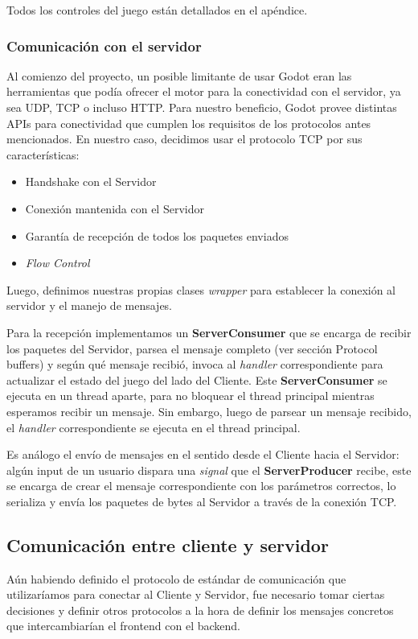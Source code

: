 Todos los controles del juego están detallados en el apéndice.


\subsubsection{Comunicación con el servidor}

\noindent Al comienzo del proyecto, un posible limitante de usar Godot eran las herramientas que podía ofrecer 
el motor para la conectividad con el servidor, ya sea UDP, TCP o incluso HTTP. 
Para nuestro beneficio, Godot provee distintas APIs para conectividad que cumplen los requisitos
de los protocolos antes mencionados. En nuestro caso, decidimos usar el protocolo TCP por sus características:
\begin{itemize}
    \item Handshake con el Servidor
    \item Conexión mantenida con el Servidor
    \item Garantía de recepción de todos los paquetes enviados
    \item \textit{Flow Control}
\end{itemize}

Luego, definimos nuestras propias clases \textit{wrapper} para establecer la conexión al servidor y el 
manejo de mensajes. 

Para la recepción implementamos un \textbf{ServerConsumer} que se encarga de recibir los paquetes 
del Servidor, parsea el mensaje completo (ver sección Protocol buffers) y según qué mensaje recibió, 
invoca al \textit{handler} correspondiente para actualizar el estado del juego del lado del Cliente.
Este \textbf{ServerConsumer} se ejecuta en un thread aparte, para no bloquear el thread principal mientras
esperamos recibir un mensaje. Sin embargo, luego de parsear un mensaje recibido, el \textit{handler}
correspondiente se ejecuta en el thread principal.

Es análogo el envío de mensajes en el sentido desde el Cliente hacia el Servidor: algún input de un 
usuario dispara una \textit{signal} que el \textbf{ServerProducer} recibe, este se encarga de crear 
el mensaje correspondiente con los parámetros correctos, lo serializa y envía los paquetes de bytes 
al Servidor a través de la conexión TCP.

\subsection{Comunicación entre cliente y servidor}
Aún habiendo definido el protocolo de estándar de comunicación que utilizaríamos para conectar al Cliente y Servidor,
fue necesario tomar ciertas decisiones y definir otros protocolos a la hora de definir los mensajes
concretos que intercambiarían el frontend con el backend.


